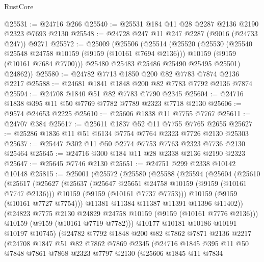 \begin{lexlean}{RustCore}
\begin{coremodule}
@25531 := @24716 @266
@25540 := @25531 @184 @11 @28 @2287 @2136 @2190 @2323 @7693 @2130
@25548 := @24728 @247 @11 @247 @2287 (@9016 (@24733 @247)) @9271
@25572 := @25009
    (@25506
      (@25514
        (@25520
          (@25530
            (@25540 @25548 @24758 @10159 (@9159 (@10161 @7694 @2136)))
            @10159
            (@9159 (@10161 @7684 @7700)))
          @25480
          @25483
          @25486
          @25490
          @25495
          @25501)
        @24862))
@25580 := @24782 @7713 @1850 @200 @82 @7783 @7874 @2136 @2217
@25588 := @24681 @1841 @1848 @200 @82 @7783 @7792 @2136 @7874
@25594 := @24708 @1840 @51 @82 @7783 @7790 @2345
@25604 := @24716 @1838 @395 @11 @50 @7769 @7782 @7789 @2323 @7718 @2130
@25606 := @9574 @24653 @2225
@25610 := @25606 @1838 @11 @7755 @7767
@25611 := @24707 @384
@25617 := @25611 @1837 @52 @11 @7755 @7765 @2655
@25627 := @25286 @1836 @11 @51 @6134 @7754 @7764 @2323 @7726 @2130 @25303
@25637 := @25447 @302 @11 @50 @2774 @7753 @7763 @2323 @7736 @2130 @25464
@25645 := @24716 @300 @184 @11 @28 @2338 @2136 @2190 @2323
@25647 := @25645 @7746 @2130
@25651 := @24751 @299 @2338 @10142 @10148
@25815 := @25001
    (@25572
      (@25580
        (@25588
          (@25594
            (@25604
              (@25610
                (@25617
                  (@25627
                    (@25637
                      (@25647 @25651 @24758 @10159 (@9159 (@10161 @7747 @2136)))
                      @10159
                      (@9159 (@10161 @7737 @7753)))
                    @10159
                    (@9159 (@10161 @7727 @7754)))
                  @11381
                  @11384
                  @11387
                  @11391
                  @11396
                  @11402))
              (@24823 @7775 @2130 @24829 @24758 @10159 (@9159 (@10161 @7776 @2136)))
              @10159
              (@9159 (@10161 @7719 @7782)))
            @10177
            @10181
            @10186
            @10191
            @10197
            @10745)
          (@24782
            @7792
            @1848
            @200
            @82
            @7862
            @7871
            @2136
            @2217
            (@24708
              @1847
              @51
              @82
              @7862
              @7869
              @2345
              (@24716
                @1845
                @395
                @11
                @50
                @7848
                @7861
                @7868
                @2323
                @7797
                @2130
                (@25606
                  @1845
                  @11
                  @7834

\end{coremodule}
\end{lexlean}
